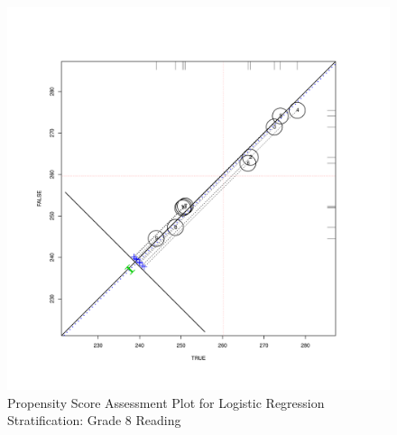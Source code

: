 \clearpage
\begin{figure}[h!]
\begin{center}
\includegraphics[height=.4\textheight,width=.4\textheight]{../Figures2009/g8read-circpsa10.pdf}
\caption{Propensity Score Assessment Plot for Logistic Regression Stratification: Grade 8 Reading}
\end{center}
\end{figure}



